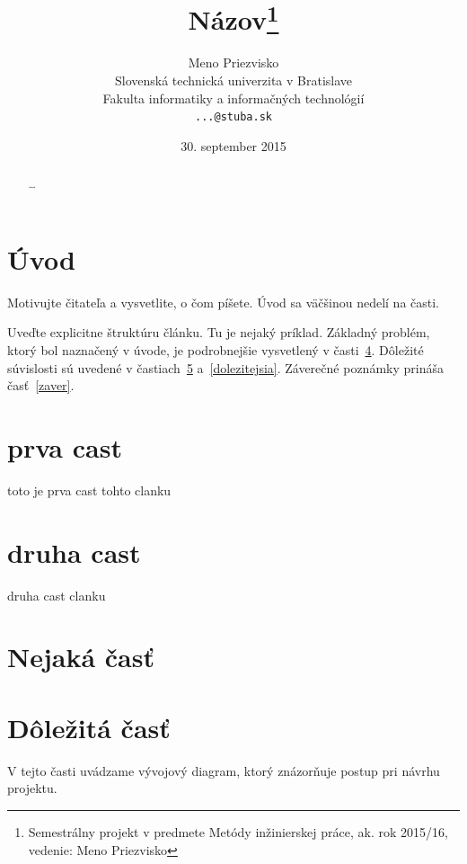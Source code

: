 \documentclass[10pt,twocolumn,twoside,slovak,a4paper]{article}
\title{Názov\thanks{Semestrálny projekt v predmete Metódy inžinierskej práce, ak. rok 2015/16, vedenie: Meno Priezvisko}} %
\author{Meno Priezvisko\\[2pt]
	{\small Slovenská technická univerzita v Bratislave}\\
	{\small Fakulta informatiky a informačných technológií}\\
	{\small \texttt{...@stuba.sk}}
	}
\date{\small 30. september 2015} %
\begin{document}
\maketitle

\begin{abstract}
\ldots
\end{abstract}



\section{Úvod}

Motivujte čitateľa a vysvetlite, o čom píšete. Úvod sa väčšinou nedelí na časti.

Uveďte explicitne štruktúru článku. Tu je nejaký príklad.
Základný problém, ktorý bol naznačený v úvode, je podrobnejšie vysvetlený v časti~\ref{nejaka}.
Dôležité súvislosti sú uvedené v častiach~\ref{dolezita} a~\ref{dolezitejsia}.
Záverečné poznámky prináša časť~\ref{zaver}.

\section{prva cast}
toto je prva cast tohto clanku
\section{druha cast}
druha cast clanku

\section{Nejaká časť} \label{nejaka}
\section{Dôležitá časť} \label{dolezita}

V tejto časti uvádzame vývojový diagram, ktorý znázorňuje postup pri návrhu projektu.
\end{document}
